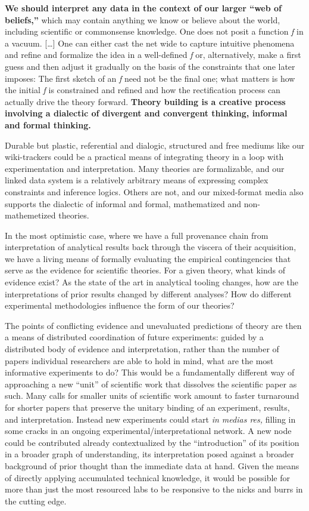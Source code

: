 \begin{leftbar}
\textbf{We should interpret any data in the context of our larger ``web
of beliefs,''} which may contain anything we know or believe about the
world, including scientific or commonsense knowledge. One does not posit
a function \emph{f} in a vacuum. {[}\ldots{]} One can either cast the
net wide to capture intuitive phenomena and refine and formalize the
idea in a well-defined \emph{f} or, alternatively, make a first guess
and then adjust it gradually on the basis of the constraints that one
later imposes: The first sketch of an \emph{f} need not be the final
one; what matters is how the initial \emph{f} is constrained and refined
and how the rectification process can actually drive the theory forward.
\textbf{Theory building is a creative process involving a dialectic of
divergent and convergent thinking, informal and formal thinking.} \citep{vanrooijTheoryTestHow2021} 
\end{leftbar}

Durable but plastic, referential and dialogic, structured and free
mediums like our wiki-trackers could be a practical means of integrating
theory in a loop with experimentation and interpretation. Many theories
are formalizable, and our linked data system is a relatively arbitrary
means of expressing complex constraints and inference logics. Others are
not, and our mixed-format media also supports the dialectic of informal
and formal, mathematized and non-mathemetized theories.

In the most optimistic case, where we have a full provenance chain from
interpretation of analytical results back through the viscera of their
acquisition, we have a living means of formally evaluating the empirical
contingencies that serve as the evidence for scientific theories. For a
given theory, what kinds of evidence exist? As the state of the art in
analytical tooling changes, how are the interpretations of prior results
changed by different analyses? How do different experimental
methodologies influence the form of our theories?

The points of conflicting evidence and unevaluated predictions of theory
are then a means of distributed coordination of future experiments:
guided by a distributed body of evidence and interpretation, rather than
the number of papers individual researchers are able to hold in mind,
what are the most informative experiments to do? This would be a
fundamentally different way of approaching a new ``unit'' of scientific
work that dissolves the scientific paper as such. Many calls for smaller
units of scientific work amount to faster turnaround for shorter papers
that preserve the unitary binding of an experiment, results, and
interpretation. Instead new experiments could start \emph{in medias
res,} filling in some cracks in an ongoing experimental/interpretational
network. A new node could be contributed already contextualized by the
``introduction'' of its position in a broader graph of understanding,
its interpretation posed against a broader background of prior thought
than the immediate data at hand. Given the means of directly applying
accumulated technical knowledge, it would be possible for more than just
the most resourced labs to be responsive to the nicks and burrs in the
cutting edge.

